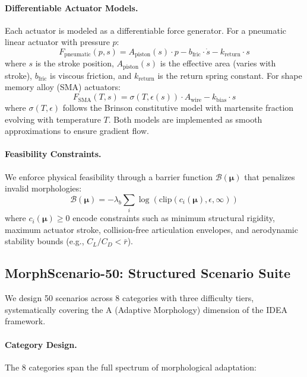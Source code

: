 \paragraph{Differentiable Actuator Models.}
Each actuator is modeled as a differentiable force generator. For a pneumatic linear actuator with pressure $p$:
\begin{equation}
    F_\text{pneumatic}(p, s) = A_\text{piston}(s) \cdot p - b_\text{fric} \cdot \dot{s} - k_\text{return} \cdot s
\end{equation}
where $s$ is the stroke position, $A_\text{piston}(s)$ is the effective area (varies with stroke), $b_\text{fric}$ is viscous friction, and $k_\text{return}$ is the return spring constant. For shape memory alloy (SMA) actuators:
\begin{equation}
    F_\text{SMA}(T, s) = \sigma(T, \epsilon(s)) \cdot A_\text{wire} - k_\text{bias} \cdot s
\end{equation}
where $\sigma(T, \epsilon)$ follows the Brinson constitutive model with martensite fraction evolving with temperature $T$. Both models are implemented as smooth approximations to ensure gradient flow.

\paragraph{Feasibility Constraints.}
We enforce physical feasibility through a barrier function $\mathcal{B}(\boldsymbol{\mu})$ that penalizes invalid morphologies:
\begin{equation}
    \mathcal{B}(\boldsymbol{\mu}) = -\lambda_b \sum_{i} \log(\text{clip}(c_i(\boldsymbol{\mu}), \epsilon, \infty))
\end{equation}
where $c_i(\boldsymbol{\mu}) \geq 0$ encode constraints such as minimum structural rigidity, maximum actuator stroke, collision-free articulation envelopes, and aerodynamic stability bounds (e.g., $C_L / C_D < \bar{r}$).

\subsection{MorphScenario-50: Structured Scenario Suite}
\label{sec:scenarios}

We design 50 scenarios across 8 categories with three difficulty tiers, systematically covering the A (Adaptive Morphology) dimension of the IDEA framework.

\paragraph{Category Design.}
The 8 categories span the full spectrum of morphological adaptation:


